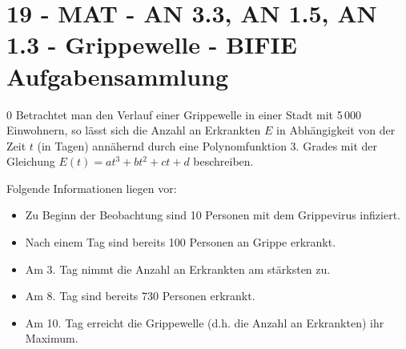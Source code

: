 \section{19 - MAT - AN 3.3, AN 1.5, AN 1.3 - Grippewelle - BIFIE Aufgabensammlung}

\begin{langesbeispiel} \item[0] %
				Betrachtet man den Verlauf einer Grippewelle in einer Stadt mit 5\,000 Einwohnern, so lässt sich die Anzahl an Erkrankten $E$ in Abhängigkeit von der Zeit $t$ (in Tagen) annähernd durch eine Polynomfunktion 3. Grades mit der Gleichung $E(t)=at^3+bt^2+ct+d$ beschreiben.
				
				Folgende Informationen liegen vor:
				
				
				\begin{itemize}
					\item Zu Beginn der Beobachtung sind 10 Personen mit dem Grippevirus infiziert.
					\item Nach einem Tag sind bereits 100 Personen an Grippe erkrankt.
					\item Am 3. Tag nimmt die Anzahl an Erkrankten am stärksten zu.
					\item Am 8. Tag sind bereits 730 Personen erkrankt.
					\item Am 10. Tag erreicht die Grippewelle (d.h. die Anzahl an Erkrankten) ihr Maximum.
				\end{itemize}
				
				\begin{center}
\end{center}


\end{langesbeispiel}
